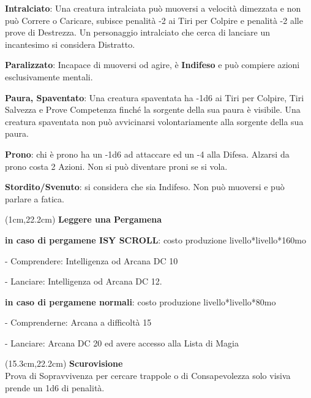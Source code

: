 \documentclass[a4paper,12 pt,openany]{book}
\begin{document}
\begin{textblock*}{19 cm}
\begin{multicols}{2}
\textbf{Intralciato}: Una creatura intralciata può muoversi a velocità dimezzata e non può Correre o Caricare, subisce penalità -2 ai Tiri per Colpire e penalità -2 alle prove di Destrezza. Un personaggio intralciato che cerca di lanciare un incantesimo si considera Distratto.

\textbf{Paralizzato}:  Incapace di muoversi od agire, è \textbf{Indifeso} e può compiere azioni esclusivamente mentali.

\textbf{Paura, Spaventato}: Una creatura spaventata ha -1d6 ai Tiri per Colpire, Tiri Salvezza e Prove Competenza finché la sorgente della sua paura è visibile. Una creatura spaventata non può avvicinarsi volontariamente alla sorgente della sua paura.

\textbf{Prono}: chi è prono ha un -1d6 ad attaccare ed un -4 alla Difesa. Alzarsi da prono costa 2 Azioni. Non si può diventare proni se si vola.

\textbf{Stordito/Svenuto}: si considera che sia Indifeso. Non può muoversi e può parlare a fatica.

\end{multicols}

\end{textblock*}


\begin{textblock*}{14 cm}(1cm,22.2cm)
\textbf{Leggere una Pergamena}

\textbf{in caso di pergamene ISY SCROLL}: costo produzione livello*livello*160mo

- Comprendere: Intelligenza od Arcana DC 10

- Lanciare: Intelligenza od Arcana DC 12.

\textbf{in caso di pergamene normali}: costo produzione livello*livello*80mo

- Comprenderne: Arcana a difficoltà 15

- Lanciare: Arcana DC 20 ed avere accesso alla Lista di Magia
\end{textblock*}


\begin{textblock*}{4.7cm}(15.3cm,22.2cm)
\textbf{Scurovisione}\\
Prova di Sopravvivenza per cercare trappole o di Consapevolezza solo visiva prende un 1d6 di penalità.
\end{textblock*}
\end{document}
